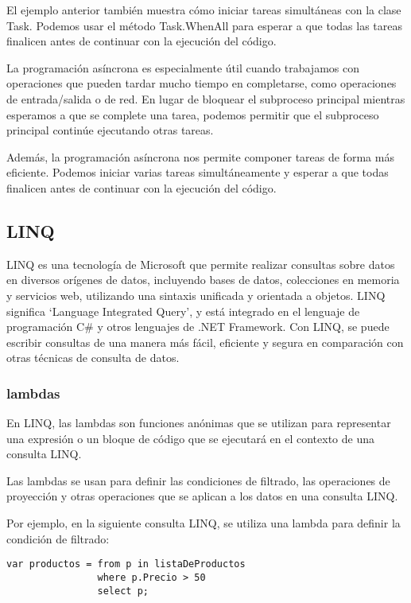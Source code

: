 \documentclass[executivepaper]{article}
\begin{document}
El ejemplo anterior también muestra cómo iniciar tareas simultáneas con la clase Task. Podemos usar el método Task.WhenAll para esperar a que todas las tareas finalicen antes de continuar con la ejecución del código.

La programación asíncrona es especialmente útil cuando trabajamos con operaciones que pueden tardar mucho tiempo en completarse, como operaciones de entrada/salida o de red. En lugar de bloquear el subproceso principal mientras esperamos a que se complete una tarea, podemos permitir que el subproceso principal continúe ejecutando otras tareas.

Además, la programación asíncrona nos permite componer tareas de forma más eficiente. Podemos iniciar varias tareas simultáneamente y esperar a que todas finalicen antes de continuar con la ejecución del código.

\newpage
\subsection{LINQ}

LINQ es una tecnología de Microsoft que permite realizar consultas sobre datos en diversos orígenes de datos, incluyendo bases de datos, colecciones en memoria y servicios web, utilizando una sintaxis unificada y orientada a objetos. LINQ significa \enquote*{Language Integrated Query}, y está integrado en el lenguaje de programación C\# y otros lenguajes de .NET Framework. Con LINQ, se puede escribir consultas de una manera más fácil, eficiente y segura en comparación con otras técnicas de consulta de datos.

\subsubsection*{lambdas}

En LINQ, las lambdas son funciones anónimas que se utilizan para representar una expresión o un bloque de código que se ejecutará en el contexto de una consulta LINQ.

Las lambdas se usan para definir las condiciones de filtrado, las operaciones de proyección y otras operaciones que se aplican a los datos en una consulta LINQ.

Por ejemplo, en la siguiente consulta LINQ, se utiliza una lambda para definir la condición de filtrado:

\begin{lstlisting}
var productos = from p in listaDeProductos
                where p.Precio > 50
                select p;
\end{lstlisting}
\end{document}
